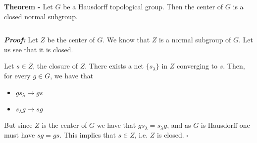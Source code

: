 \documentclass[12pt]{article}
\begin{document}
{\bf Theorem -} Let $G$ be a Hausdorff topological group. Then the center of $G$ is a closed normal subgroup.

$\,$

{\bf \emph{Proof:}} Let $Z$ be the center of $G$. We know that $Z$ is a normal subgroup of $G$. Let us see that it is closed.

Let $s \in \overline{Z}$, the closure of $Z$. There exists a net $\{s_{\lambda}\}$ in $Z$ converging to $s$. Then, for every $g \in G$, we have that
\begin{itemize}
\item $gs_{\lambda} \longrightarrow gs$
\item $s_{\lambda}g \longrightarrow sg$
\end{itemize}
But since $Z$ is the center of $G$ we have that $gs_{\lambda} = s_{\lambda}g$, and as $G$ is Hausdorff one must have $sg=gs$. This implies that $s \in Z$, i.e. $Z$ is closed. $\square$
\end{document}
